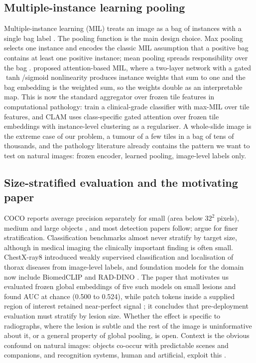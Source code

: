 \documentclass[10pt,letterpaper,twocolumn]{article}
\begin{document}
\subsection{Multiple-instance learning pooling}
Multiple-instance learning (MIL) treats an image as a bag of instances with a single bag label
\citep{dietterich1997mil}. The pooling function is the main design choice. Max pooling selects
one instance and encodes the classic MIL assumption that a positive bag contains at least one
positive instance; mean pooling spreads responsibility over the bag
\citep{wang2018revisiting}. \citet{ilse2018attention} proposed attention-based MIL,
where a two-layer network with a gated $\tanh$/sigmoid nonlinearity produces instance weights
that sum to one and the bag embedding is the weighted sum, so the weights double as an
interpretable map. This is now the standard aggregator over frozen tile features in
computational pathology: \citet{campanella2019clinical} train a clinical-grade classifier with
max-MIL over tile features, and CLAM \citep{lu2021clam} uses class-specific gated attention
over frozen tile embeddings with instance-level clustering as a regulariser. A whole-slide image
is the extreme case of our problem, a tumour of a few tiles in a bag of tens of thousands, and
the pathology literature already contains the pattern we want to test on natural images: frozen
encoder, learned pooling, image-level labels only.

\subsection{Size-stratified evaluation and the motivating paper}
COCO reports average precision separately for small (area below $32^2$ pixels), medium and
large objects \citep{lin2014coco}, and most detection papers follow;
\citet{cheng2023smallobject} argue for finer stratification. Classification benchmarks almost never stratify by target size, although in medical imaging the clinically important finding is often small. ChestX-ray8 \citep{wang2017chestxray8} introduced weakly supervised
classification and localisation of thorax diseases from image-level labels, and foundation
models for the domain now include BiomedCLIP \citep{zhang2023biomedclip} and RAD-DINO
\citep{perezgarcia2025raddino}. The paper that motivates us evaluated frozen global embeddings
of five such models on small lesions and found AUC at chance (0.500 to 0.524), while patch
tokens inside a supplied region of interest retained near-perfect signal
\citep{smalllesion2026}; it concludes that pre-deployment evaluation must stratify by lesion
size. Whether the effect is specific to radiographs, where the lesion is subtle and the rest of
the image is uninformative about it, or a general property of global pooling, is open. Context
is the obvious confound on natural images: objects co-occur with predictable scenes and
companions, and recognition systems, human and artificial, exploit this
\citep{oliva2007context}.
\end{document}
